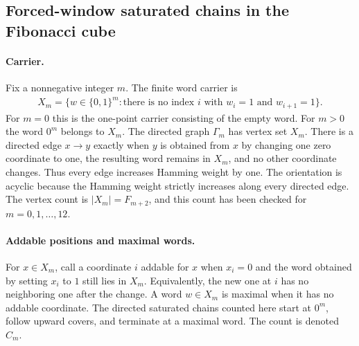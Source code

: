 
\subsection{Forced-window saturated chains in the Fibonacci cube}
\label{sec:window-fibonacci-cube-saturated-chain}

\paragraph{Carrier.}
Fix a nonnegative integer $m$. The finite word carrier is
$$
\begin{aligned}
X_m = \{w \in \{0,1\}^m : \text{there is no index } i \text{ with } w_i=1 \text{ and } w_{i+1}=1\}.
\end{aligned}
$$
For $m=0$ this is the one-point carrier consisting of the empty word. For $m>0$ the word $0^m$ belongs to $X_m$. The directed graph $\Gamma_m$ has vertex set $X_m$. There is a directed edge $x \to y$ exactly when $y$ is obtained from $x$ by changing one zero coordinate to one, the resulting word remains in $X_m$, and no other coordinate changes. Thus every edge increases Hamming weight by one. The orientation is acyclic because the Hamming weight strictly increases along every directed edge. The vertex count is $|X_m|=F_{m+2}$, and this count has been checked for $m=0,1,\ldots,12$.

\paragraph{Addable positions and maximal words.}
For $x \in X_m$, call a coordinate $i$ addable for $x$ when $x_i=0$ and the word obtained by setting $x_i$ to $1$ still lies in $X_m$. Equivalently, the new one at $i$ has no neighboring one after the change. A word $w \in X_m$ is maximal when it has no addable coordinate. The directed saturated chains counted here start at $0^m$, follow upward covers, and terminate at a maximal word. The count is denoted $C_m$.

